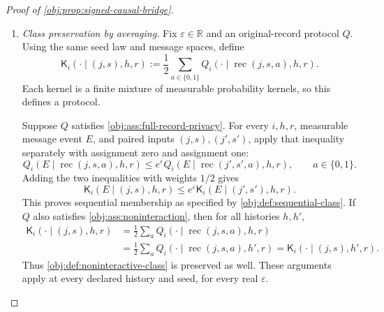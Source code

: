 \begin{proof}[Proof of \cref{obj:prop:signed-causal-bridge}]
\begin{enumerate}
Define the observed-record reconstruction map on the whole paired
alphabet and both assignment values by
\[
\operatorname{rec}(j,s,a)
:=\left(j,a,\frac{1+s(2a-1)}2\right),
\qquad
j\in[d],\quad s\in\{-1,1\},\quad a\in\{0,1\}.
\]
Its outcome coordinate is binary. Summing the full-data atom masses over
the unused potential outcome gives
\[
\begin{aligned}
G_\theta(X=j,S=s,A=a)
&=\frac1{2d}\,
\pi_{aj}\!\left(\frac{1+s(2a-1)}2\right)\\
&=\frac1{2d}\,\frac{1+s\theta_j}{2}
=\frac{P_\theta(j,s)}2.
\end{aligned}
\]
Indeed, for \(a=0\), the reconstructed outcome is \((1-s)/2\), so the
two choices of \(s\) select the failure and success masses of
\(\operatorname{Bernoulli}((1-\theta_j)/2)\). For \(a=1\), it is
\((1+s)/2\), selecting the success and failure masses of
\(\operatorname{Bernoulli}((1+\theta_j)/2)\). In both cases the selected
mass is \((1+s\theta_j)/2\). Thus the joint signed-input and assignment
law is
\[
\mathcal L_{G_\theta}(X,S,A)
=P_\theta\otimes\operatorname{Bernoulli}(1/2).
\]

For every binary observed record, \((2A-1)^2=1\), and therefore
\[
S(2A-1)
=(2A-1)(2Y-1)(2A-1)=2Y-1.
\]
This identity holds pointwise and hence \(G_\theta\)-almost surely.

\item \emph{Class preservation by averaging.}
Fix \(\varepsilon\in\mathbb R\) and an original-record protocol \(Q\).
Using the same seed law and message spaces, define
\[
\mathsf K_i(\cdot\mid(j,s),h,r)
:=\frac12\sum_{a\in\{0,1\}}
Q_i(\cdot\mid\operatorname{rec}(j,s,a),h,r).
\]
Each kernel is a finite mixture of measurable probability kernels, so
this defines a protocol.

Suppose \(Q\) satisfies \cref{obj:ass:full-record-privacy}. For every
\(i,h,r\), measurable message event \(E\), and paired inputs
\((j,s),(j',s')\), apply that inequality separately with assignment zero
and assignment one:
\[
Q_i(E\mid\operatorname{rec}(j,s,a),h,r)
\le e^\varepsilon
Q_i(E\mid\operatorname{rec}(j',s',a),h,r),
\qquad a\in\{0,1\}.
\]
Adding the two inequalities with weights \(1/2\) gives
\[
\mathsf K_i(E\mid(j,s),h,r)
\le e^\varepsilon\mathsf K_i(E\mid(j',s'),h,r).
\]
This proves sequential membership as specified by
\cref{obj:def:sequential-class}. If \(Q\) also satisfies
\cref{obj:ass:noninteraction}, then for all histories \(h,h'\),
\[
\begin{aligned}
\mathsf K_i(\cdot\mid(j,s),h,r)
&=\frac12\sum_a
Q_i(\cdot\mid\operatorname{rec}(j,s,a),h,r)\\
&=\frac12\sum_a
Q_i(\cdot\mid\operatorname{rec}(j,s,a),h',r)
=\mathsf K_i(\cdot\mid(j,s),h',r).
\end{aligned}
\]
Thus \cref{obj:def:noninteractive-class} is preserved as well. These
arguments apply at every declared history and seed, for every real
\(\varepsilon\).


\end{enumerate}
\end{proof}
